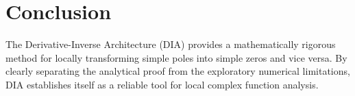 \documentclass[12pt,a4paper]{article}
\begin{document}
\section{Conclusion}
The Derivative-Inverse Architecture (DIA) provides a mathematically rigorous method for locally transforming simple poles into simple zeros and vice versa. By clearly separating the analytical proof from the exploratory numerical limitations, DIA establishes itself as a reliable tool for local complex function analysis.
\end{document}
